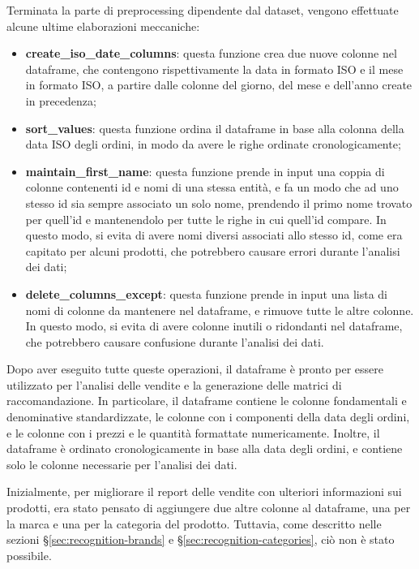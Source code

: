 Terminata la parte di preprocessing dipendente dal dataset, vengono effettuate alcune ultime elaborazioni meccaniche:
\begin{itemize}
    \item \textbf{create\_iso\_date\_columns}: questa funzione crea due nuove colonne nel dataframe, che contengono rispettivamente la data in formato ISO e il mese in formato ISO, a partire dalle colonne del giorno, del mese e dell'anno create in precedenza;
    \item \textbf{sort\_values}: questa funzione ordina il dataframe in base alla colonna della data ISO degli ordini, in modo da avere le righe ordinate cronologicamente;
    \item \textbf{maintain\_first\_name}: questa funzione prende in input una coppia di colonne contenenti id e nomi di una stessa entità, e fa un modo che ad uno stesso id sia sempre associato un solo nome, prendendo il primo nome trovato per quell'id e mantenendolo per tutte le righe in cui quell'id compare. In questo modo, si evita di avere nomi diversi associati allo stesso id, come era capitato per alcuni prodotti, che potrebbero causare errori durante l'analisi dei dati;
    \item \textbf{delete\_columns\_except}: questa funzione prende in input una lista di nomi di colonne da mantenere nel dataframe, e rimuove tutte le altre colonne. In questo modo, si evita di avere colonne inutili o ridondanti nel dataframe, che potrebbero causare confusione durante l'analisi dei dati.
\end{itemize}

Dopo aver eseguito tutte queste operazioni, il dataframe è pronto per essere utilizzato per l'analisi delle vendite e la generazione delle matrici di raccomandazione. In particolare, il dataframe contiene le colonne fondamentali e denominative standardizzate, le colonne con i componenti della data degli ordini, e le colonne con i prezzi e le quantità formattate numericamente. Inoltre, il dataframe è ordinato cronologicamente in base alla data degli ordini, e contiene solo le colonne necessarie per l'analisi dei dati.

Inizialmente, per migliorare il report delle vendite con ulteriori informazioni sui prodotti, era stato pensato di aggiungere due altre colonne al dataframe, una per la marca e una per la categoria del prodotto. Tuttavia, come descritto nelle sezioni \S\ref{sec:recognition-brands} e \S\ref{sec:recognition-categories}, ciò non è stato possibile.


